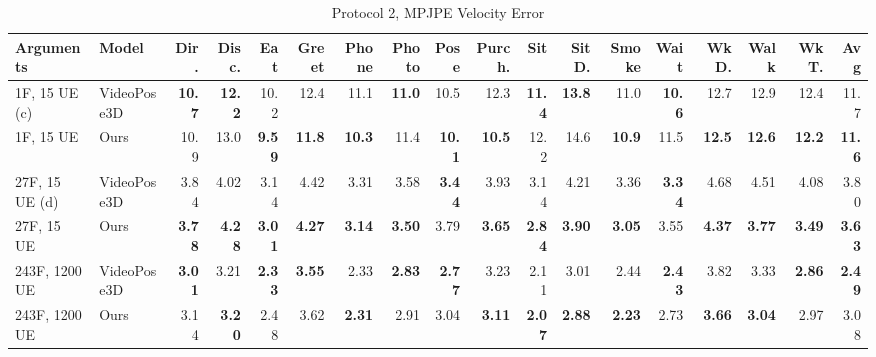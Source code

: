 \documentclass[10pt,twocolumn,letterpaper]{article}
\begin{document}
\begin{center}
\begin{table}
\small
\setlength\tabcolsep{2.3pt}
\begin{tabular}{l|l|rrrrrrrrrrrrrrrr} 
Arguments & Model & Dir. & Disc. & Eat & Greet & Phone & Photo & Pose & Purch. & Sit & SitD. & Smoke & Wait & WkD. & Walk & WkT. & \textbf{Avg} \\
\hline
1F, 15 UE (c) & VideoPose3D & \textbf{10.7} & \textbf{12.2} & 10.2 & 12.4 & 11.1 & \textbf{11.0} & 10.5 & 12.3 & \textbf{11.4} & \textbf{13.8} & 11.0 & \textbf{10.6} & 12.7 & 12.9 & 12.4 & 11.7  \\
1F, 15 UE & Ours & 10.9 & 13.0 & \textbf{9.59} & \textbf{11.8} & \textbf{10.3} & 11.4 & \textbf{10.1} & \textbf{10.5} & 12.2 & 14.6 & \textbf{10.9} & 11.5 & \textbf{12.5} & \textbf{12.6} & \textbf{12.2} & \textbf{11.6} \\
\hline
27F, 15 UE (d) & VideoPose3D & 3.84 & 4.02 & 3.14 & 4.42 & 3.31 & 3.58 & \textbf{3.44} & 3.93 & 3.14 & 4.21 & 3.36 & \textbf{3.34} & 4.68 & 4.51 & 4.08 & 3.80 \\
27F, 15 UE & Ours & \textbf{3.78} & \textbf{4.28} & \textbf{3.01} & \textbf{4.27} & \textbf{3.14} & \textbf{3.50} & 3.79 & \textbf{3.65} & \textbf{2.84} & \textbf{3.90} & \textbf{3.05} & 3.55 & \textbf{4.37} & \textbf{3.77} & \textbf{3.49} & \textbf{3.63}\\
\hline

243F, 1200 UE & VideoPose3D & \textbf{3.01} & 3.21 & \textbf{2.33} & \textbf{3.55} & 2.33 & \textbf{2.83} & \textbf{2.77} & 3.23 & 2.11 & 3.01 & 2.44 & \textbf{2.43} & 3.82 & 3.33 & \textbf{2.86} & \textbf{2.49} \\
243F, 1200 UE & Ours & 3.14 & \textbf{3.20} & 2.48 & 3.62 & \textbf{2.31} & 2.91 & 3.04 & \textbf{3.11} & \textbf{2.07} & \textbf{2.88} & \textbf{2.23} & 2.73 & \textbf{3.66} & \textbf{3.04} & 2.97 & 3.08 \\

 
\hline

\hline
\end{tabular}

\caption{Protocol 2, MPJPE Velocity Error}
\label{tab:V-MPJPE Error}
\end{table}
\end{center}
\end{document}
